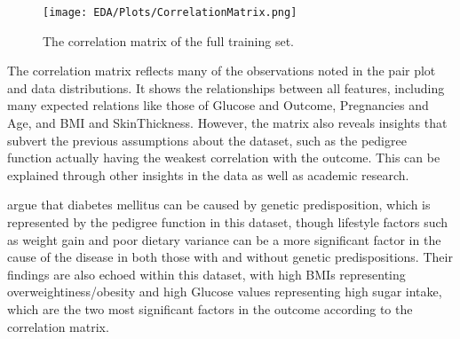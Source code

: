 \begin{figure}[H]
    \centering
    \texttt{[image: EDA/Plots/CorrelationMatrix.png]}
    \caption{The correlation matrix of the full training set.}
    \label{fig:CorrMatrix}
\end{figure}

\para The correlation matrix reflects many of the observations noted in the pair plot and data distributions.
It shows the relationships between all features, including many expected relations like those of Glucose and Outcome,
Pregnancies and Age, and BMI and SkinThickness. However, the matrix also reveals insights that subvert the previous 
assumptions about the dataset, such as the pedigree function actually having the weakest correlation with the outcome.
This can be explained through other insights in the data as well as academic research.

\para \textcite{mambiya_play_2019} argue that diabetes mellitus can be caused by genetic predisposition, which is 
represented by the pedigree function in this dataset, though lifestyle factors such as weight gain and poor dietary 
variance can be a more significant factor in the cause of the disease in both those with and without genetic predispositions.
Their findings are also echoed within this dataset, with high BMIs representing overweightiness/obesity and high Glucose values representing 
high sugar intake, which are the two most significant factors in the outcome according to the correlation matrix.

\endgroup